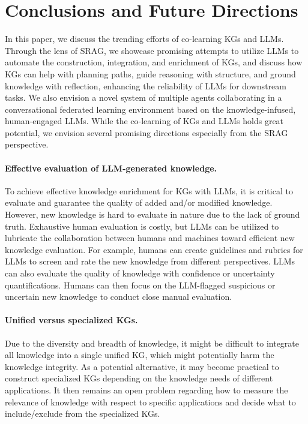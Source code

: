 \section{Conclusions and Future Directions}

In this paper, we discuss the trending efforts of co-learning KGs and LLMs. Through the lens of SRAG, we showcase promising attempts to utilize LLMs to automate the construction, integration, and enrichment of KGs, and discuss how KGs can help with planning paths, guide reasoning with structure, and ground knowledge with reflection, enhancing the reliability of LLMs for downstream tasks. We also envision a novel system of multiple agents collaborating in a conversational federated learning environment based on the knowledge-infused, human-engaged LLMs. While the co-learning of KGs and LLMs holds great potential, we envision several promising directions especially from the SRAG perspective.

\paragraph{Effective evaluation of LLM-generated knowledge.}
To achieve effective knowledge enrichment for KGs with LLMs, it is critical to evaluate and guarantee the quality of added and/or modified knowledge. However, new knowledge is hard to evaluate in nature due to the lack of ground truth. Exhaustive human evaluation is costly, but LLMs can be utilized to lubricate the collaboration between humans and machines toward efficient new knowledge evaluation. For example, humans can create guidelines and rubrics for LLMs to screen and rate the new knowledge from different perspectives. LLMs can also evaluate the quality of knowledge with confidence or uncertainty quantifications. Humans can then focus on the LLM-flagged suspicious or uncertain new knowledge to conduct close manual evaluation. 

\paragraph{Unified versus specialized KGs.}
Due to the diversity and breadth of knowledge, it might be difficult to integrate all knowledge into a single unified KG, which might potentially harm the knowledge integrity. As a potential alternative, it may become practical to construct specialized KGs depending on the knowledge needs of different applications. It then remains an open problem regarding how to measure the relevance of knowledge with respect to specific applications and decide what to include/exclude from the specialized KGs.

